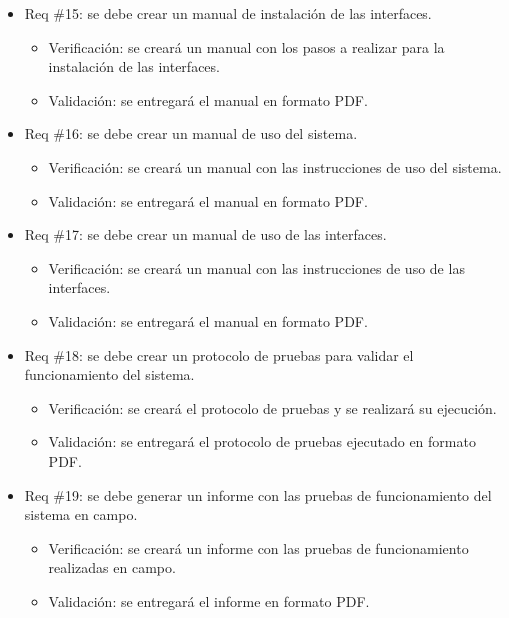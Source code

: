 \documentclass[
11pt%
]{charter}
\begin{document}
\begin{itemize}
\item Req \#15: se debe crear un manual de instalación de las interfaces.

\begin{itemize}
	\item Verificación: se creará un manual con los pasos a realizar para la instalación de las interfaces.
	\item Validación: se entregará el manual en formato PDF.
\end{itemize}

\item Req \#16: se debe crear un manual de uso del sistema.

\begin{itemize}
	\item Verificación: se creará un manual con las instrucciones de uso del sistema.
	\item Validación: se entregará el manual en formato PDF.
\end{itemize}

\item Req \#17: se debe crear un manual de uso de las interfaces.

\begin{itemize}
	\item Verificación: se creará un manual con las instrucciones de uso de las interfaces.
	\item Validación: se entregará el manual en formato PDF.
\end{itemize}

\item Req \#18: se debe crear un protocolo de pruebas para validar el funcionamiento del sistema.

\begin{itemize}
	\item Verificación: se creará el protocolo de pruebas y se realizará su ejecución.
	\item Validación: se entregará el protocolo de pruebas ejecutado en formato PDF.
\end{itemize}

\item Req \#19: se debe generar un informe con las pruebas de funcionamiento del sistema en campo.

\begin{itemize}
	\item Verificación: se creará un informe con las pruebas de funcionamiento realizadas en campo.
	\item Validación: se entregará el informe en formato PDF.
\end{itemize}


\end{itemize}
\end{document}

